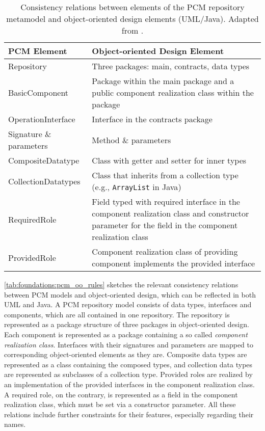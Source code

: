 \begin{table}
	\centering 
    \small
    \renewcommand{\arraystretch}{1.4}
	\begin{tabular}{p{3.2cm} p{6.6cm}}
		\toprule
        \textbf{\gls{PCM} Element}  & \textbf{Object-oriented Design Element} \\
        \midrule
		Repository              & Three packages: main, contracts, data types\\
		BasicComponent 		    & Package within the main package and a public component realization class within the package \\
		OperationInterface		& Interface in the contracts package \\
		Signature \& parameters & Method \& parameters \\
		CompositeDatatype       & Class with getter and setter for inner types\\
		CollectionDatatypes     & Class that inherits from a collection type (e.g., \texttt{ArrayList} in Java) \\
		RequiredRole		    & Field typed with required interface in the component realization class and constructor parameter for the field in the component realization class\\
		ProvidedRole		    & Component realization class of providing component implements the provided interface\\
		\bottomrule
	\end{tabular}
	\caption[Consistency relations between \acrshort{PCM} and \acrshort{UML}/Java]{Consistency relations between elements of the \gls{PCM} repository metamodel and object-oriented design elements (\gls{UML}/Java). Adapted from \cite[Table 4.1]{langhammer2017a}.}
	\label{tab:foundations:pcm_oo_rules}
\end{table}

\autoref{tab:foundations:pcm_oo_rules} sketches the relevant consistency relations between \gls{PCM} models and object-oriented design, which can be reflected in both \gls{UML} and Java.
A \gls{PCM} repository model consists of data types, interfaces and components, which are all contained in one repository.
The repository is represented as a package structure of three packages in object-oriented design.
Each component is represented as a package containing a so called \emph{component realization class}.
Interfaces with their signatures and parameters are mapped to corresponding object-oriented elements as they are.
Composite data types are represented as a class containing the composed types, and collection data types are represented as subclasses of a collection type.
Provided roles are realized by an implementation of the provided interfaces in the component realization class.
A required role, on the contrary, is represented as a field in the component realization class, which must be set via a constructor parameter.
All these relations include further constraints for their features, especially regarding their names. %

